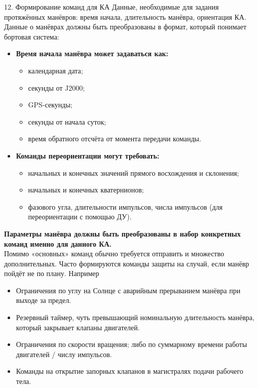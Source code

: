 \documentclass[8pt]{beamer}
\begin{document}
\begin{frame}{12. Формирование команд для КА}
Данные, необходимые для задания протяжённых манёвров: время начала, длительность манёвра, ориентация КА. Данные о манёврах должны быть преобразованы в формат, который понимает бортовая система:
\begin{itemize}
    \item \textbf{Время начала манёвра может задаваться как:}
    \begin{itemize}
        \item календарная дата;
        \item секунды от J2000;
        \item GPS-секунды;
        \item секунды от начала суток;
        \item время обратного отсчёта от момента передачи команды.
    \end{itemize}

    \item \textbf{Команды переориентации могут требовать:}
    \begin{itemize}
        \item начальных и конечных значений прямого восхождения и склонения;
        \item начальных и конечных кватернионов;
        \item фазового угла, длительности импульсов, числа импульсов (для переориентации с помощью ДУ).
    \end{itemize}
\end{itemize}
\textbf{Параметры манёвра должны быть преобразованы в набор конкретных команд именно для данного КА.} \\
\smallskip
Помимо «основных» команд обычно требуется отправить и множество дополнительных. Часто формируются команды защиты на случай, если манёвр пойдёт не по плану. Например
\begin{itemize}
    \item Ограничения по углу на Солнце с аварийным прерыванием манёвра при выходе за предел.
    \item Резервный таймер, чуть превышающий номинальную длительность манёвра, который закрывает клапаны двигателей.
    \item Ограничения по скорости вращения; либо по суммарному времени работы двигателей / числу импульсов.
    \item Команды на открытие запорных клапанов в магистралях подачи рабочего тела.
\end{itemize}
\end{frame}
\end{document}
